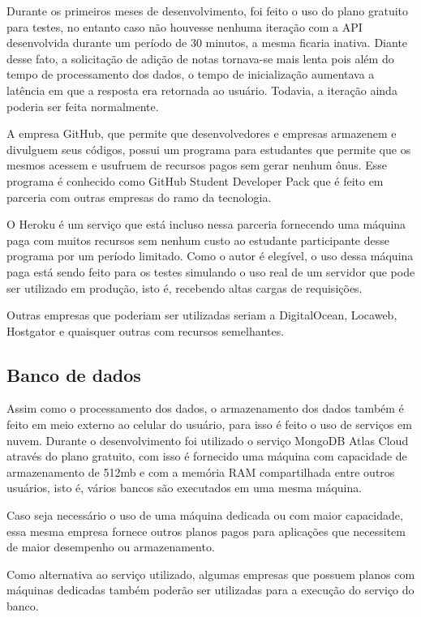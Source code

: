 Durante os primeiros meses de desenvolvimento, foi feito o uso do plano gratuito para testes, no entanto caso não houvesse nenhuma iteração com a API desenvolvida durante um período de 30 minutos, a mesma ficaria inativa. Diante desse fato, a solicitação de adição de notas tornava-se mais lenta pois além do tempo de processamento dos dados, o tempo de inicialização aumentava a latência em que a resposta era retornada ao usuário. Todavia, a iteração ainda poderia ser feita normalmente.

A empresa GitHub, que permite que desenvolvedores e empresas armazenem e divulguem seus códigos, possui um programa para estudantes que permite que os mesmos acessem e usufruem de recursos pagos sem gerar nenhum ônus. Esse programa é conhecido como GitHub Student Developer Pack\cite{githubStudentPack} que é feito em parceria com outras empresas do ramo da tecnologia.

O Heroku é um serviço que está incluso nessa parceria fornecendo uma máquina paga com muitos recursos sem nenhum custo ao estudante participante desse programa por um período limitado. Como o autor é elegível, o uso dessa máquina paga está sendo feito para os testes simulando o uso real de um servidor que pode ser utilizado em produção, isto é, recebendo altas cargas de requisições.

Outras empresas que poderiam ser utilizadas seriam a DigitalOcean, Locaweb, Hostgator e quaisquer outras com recursos semelhantes.

\subsection{Banco de dados}

Assim como o processamento dos dados, o armazenamento dos dados também é feito em meio externo ao celular do usuário, para isso é feito o uso de serviços em nuvem. Durante o desenvolvimento foi utilizado o serviço MongoDB Atlas Cloud através do plano gratuito, com isso é fornecido uma máquina com capacidade de armazenamento de 512mb e com a memória RAM compartilhada entre outros usuários, isto é, vários bancos são executados em uma mesma máquina.

Caso seja necessário o uso de uma máquina dedicada ou com maior capacidade, essa mesma empresa fornece outros planos pagos para aplicações que necessitem de maior desempenho ou armazenamento.

Como alternativa ao serviço utilizado, algumas empresas que possuem planos com máquinas dedicadas também poderão ser utilizadas para a execução do serviço do banco.

